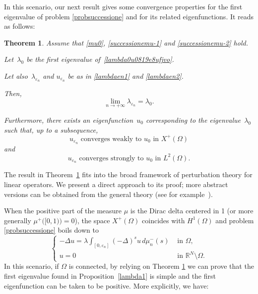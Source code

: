 \documentclass[12pt,a4paper,intlimits,sumlimits]{amsart}
\def \R {\mathbb{R}}
\theoremstyle{definition}
\theoremstyle{plain}
\newtheorem{theorem}[definition]{Theorem}
\numberwithin{equation}{section}
\begin{document}
In this scenario, our next result gives some convergence properties for the first eigenvalue of problem \eqref{probsuccessione} and for its related eigenfunctions. It reads as follows:

\begin{theorem}\label{main1}
Assume that \eqref{mu0}, \eqref{successionemu-1} and \eqref{successionemu-2} hold. 

Let~$\lambda_0$ be the first eigenvalue of~\eqref{lambda0u0819e8ufjvo}.

Let also~$\lambda_{\varepsilon_n}$ and $u_{\varepsilon_n}$ be as in \eqref{lambdaen1} and \eqref{lambdaen2}.

Then, \begin{equation}\label{statement12-PRIMO}
\lim_{n\to +\infty} \lambda_{\varepsilon_n} =\lambda_0.\end{equation}

Furthermore,
there exists an eigenfunction~$u_0$ corresponding to the eigenvalue~$\lambda_0$ such that, up to a subsequence,
\begin{equation}\label{statement121P0EIDFJWEOBGML}
{\mbox{$u_{\varepsilon_n}$ converges weakly to $u_0$ in $X^+(\Omega)$}}\end{equation}
and
\begin{equation}\label{statement12}
{\mbox{$u_{\varepsilon_n}$ converges strongly to~$u_0$ in~$L^2(\Omega)$.}}
\end{equation}
\end{theorem}

The result in Theorem~\ref{main1} fits into the broad framework of perturbation theory for linear operators. We present a direct approach to its proof; more abstract versions can be obtained from the general theory (see for example~\cite{MR1335452}).

When the positive part of the measure $\mu$ is the Dirac delta centered in 1 (or more generally $\mu^+\big([0,1)\big)=0$), the space $X^+(\Omega)$ coincides with $H^1(\Omega)$ and problem \eqref{probsuccessione} boils down to
\begin{equation}\label{probsuccessionefacile}
\begin{cases}
\displaystyle -\Delta u= \lambda \int_{[0, \varepsilon_n]} (-\Delta)^s u\, d\mu_n^-(s)  &  \mbox{ in } \Omega,
\\
u=0    &  \mbox{ in } \R^N \setminus \Omega.
\end{cases}
\end{equation}
In this scenario, if $\Omega$ is connected,
by relying on Theorem \ref{main1} we can prove that the first eigenvalue found in 
Proposition~\ref{lambda1} is simple and the first eigenfunction can be 
taken to be positive. 
More explicitly, we have:
\end{document}

